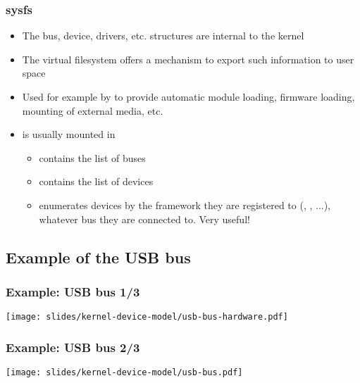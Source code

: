\begin{frame}
  \frametitle{sysfs}
  \begin{itemize}
  \item The bus, device, drivers, etc. structures are internal to the
    kernel
  \item The  virtual filesystem offers a mechanism to
    export such information to user space
  \item Used for example by  to provide automatic module loading,
    firmware loading, mounting of external media, etc.
  \item {} is usually mounted in 
    \begin{itemize}
    \item {} contains the list of buses
    \item {} contains the list of devices
    \item {} enumerates devices by the framework they are
          registered to (, , ...),
          whatever bus they are connected to. Very useful!
    \end{itemize}
  \end{itemize}
\end{frame}

\subsection{Example of the USB bus}

\begin{frame}
\frametitle{Example: USB bus 1/3}
  \begin{center}
    \texttt{[image: slides/kernel-device-model/usb-bus-hardware.pdf]}
  \end{center}
\end{frame}

\begin{frame}
\frametitle{Example: USB bus 2/3}
  \begin{center}
    \texttt{[image: slides/kernel-device-model/usb-bus.pdf]}
  \end{center}
\end{frame}


